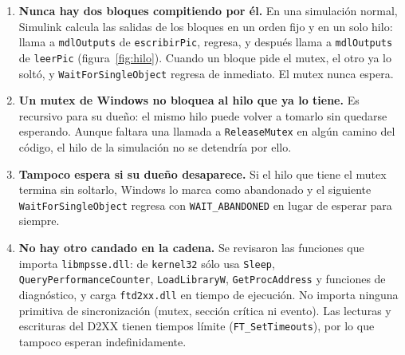 \documentclass[11pt]{article}
\newcommand{\code}[1]{\texttt{#1}}
\begin{document}
\begin{enumerate}
\item \textbf{Nunca hay dos bloques compitiendo por él.} En una simulación
  normal, Simulink calcula las salidas de los bloques en un orden fijo y en un
  solo hilo: llama a \code{mdlOutputs} de \code{escribirPic}, regresa, y
  después llama a \code{mdlOutputs} de \code{leerPic}
  (figura~\ref{fig:hilo}). Cuando un bloque pide el mutex, el otro ya lo soltó,
  y \code{WaitForSingleObject} regresa de inmediato. El mutex nunca espera.
\item \textbf{Un mutex de Windows no bloquea al hilo que ya lo tiene.} Es
  recursivo para su dueño: el mismo hilo puede volver a tomarlo sin quedarse
  esperando. Aunque faltara una llamada a \code{ReleaseMutex} en algún camino
  del código, el hilo de la simulación no se detendría por ello.
\item \textbf{Tampoco espera si su dueño desaparece.} Si el hilo que tiene el
  mutex termina sin soltarlo, Windows lo marca como abandonado y el siguiente
  \code{WaitForSingleObject} regresa con \code{WAIT\_ABANDONED} en lugar de
  esperar para siempre.
\item \textbf{No hay otro candado en la cadena.} Se revisaron las funciones que
  importa \code{libmpsse.dll}: de \code{kernel32} sólo usa \code{Sleep},
  \code{QueryPerformanceCounter}, \code{LoadLibraryW}, \code{GetProcAddress} y
  funciones de diagnóstico, y carga \code{ftd2xx.dll} en tiempo de ejecución.
  No importa ninguna primitiva de sincronización (mutex, sección crítica ni
  evento). Las lecturas y escrituras del D2XX tienen tiempos límite
  (\code{FT\_SetTimeouts}), por lo que tampoco esperan indefinidamente.
\end{enumerate}
\end{document}
